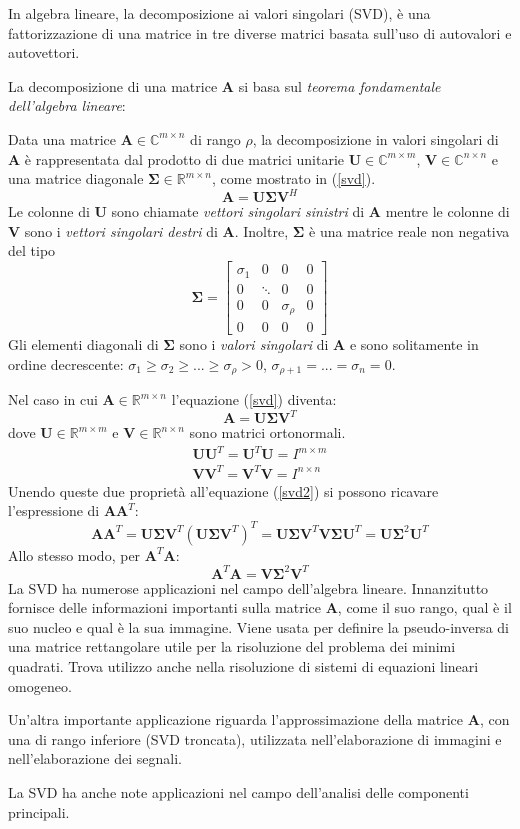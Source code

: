 In algebra lineare, la decomposizione ai valori singolari (SVD), è una fattorizzazione di una matrice in tre diverse matrici basata sull'uso di autovalori e autovettori.

La decomposizione di una matrice $\mathbf{A}$ si basa sul \textit{teorema fondamentale dell'algebra lineare}: 

Data una matrice $\mathbf{A}\in\mathbb{C}^{m\times n}$ di rango $\rho$, la decomposizione in valori singolari di $\mathbf{A}$ è rappresentata dal prodotto di due matrici unitarie $\mathbf{U}\in\mathbb{C}^{m\times m}$, $\mathbf{V}\in\mathbb{C}^{n\times n}$ e una matrice diagonale $\mathbf{\Sigma}\in\mathbb{R}^{m\times n}$, come mostrato in (\ref{svd}).
\begin{equation}\label{svd}
\mathbf{A}=\mathbf{U}\mathbf{\Sigma}\mathbf{V}^H
\end{equation}
Le colonne di $\mathbf{U}$ sono chiamate \textit{vettori singolari sinistri} di $\mathbf{A}$ mentre le colonne di $\mathbf{V}$ sono i \textit{vettori singolari destri} di $\mathbf{A}$. Inoltre, $\mathbf{\Sigma}$ è una matrice reale non negativa del tipo
\[
\mathbf{\Sigma}=\begin{bmatrix}
\sigma_1 & 0 & 0 & 0\\
0 & \ddots & 0 & 0\\
0 & 0 & \sigma_{\rho} & 0\\
0 & 0 & 0 & 0
\end{bmatrix}
\]
Gli elementi diagonali di $\mathbf{\Sigma}$ sono i \textit{valori singolari} di $\mathbf{A}$ e sono solitamente in ordine decrescente: $\sigma_1 \geq \sigma_2 \geq ... \geq \sigma_{\rho} > 0$, $\sigma_{\rho+1}=...=\sigma_n=0$.

Nel caso in cui $\mathbf{A}\in\mathbb{R}^{m\times n}$ l'equazione (\ref{svd}) diventa:
\begin{equation}\label{svd2}
\mathbf{A}=\mathbf{U}\mathbf{\Sigma}\mathbf{V}^T
\end{equation}
dove $\mathbf{U}\in\mathbb{R}^{m\times m}$ e $\mathbf{V}\in\mathbb{R}^{n\times n}$ sono matrici ortonormali.
\begin{eqnarray}
\mathbf{U}\mathbf{U}^T=\mathbf{U}^T\mathbf{U}=I^{m\times m}\\
\mathbf{V}\mathbf{V}^T=\mathbf{V}^T\mathbf{V}=I^{n\times n}
\end{eqnarray}
Unendo queste due proprietà all'equazione (\ref{svd2}) si possono ricavare l'espressione di $\mathbf{A}\mathbf{A}^T$:
\[
\mathbf{A}\mathbf{A}^T=\mathbf{U}\mathbf{\Sigma}\mathbf{V}^T(\mathbf{U}\mathbf{\Sigma}\mathbf{V}^T)^T=\mathbf{U}\mathbf{\Sigma}\mathbf{V}^T\mathbf{V}\mathbf{\Sigma}\mathbf{U}^T=\mathbf{U}\mathbf{\Sigma}^2\mathbf{U}^T
\]
Allo stesso modo, per $\mathbf{A}^T\mathbf{A}$:
\[
\mathbf{A}^T\mathbf{A}=\mathbf{V}\mathbf{\Sigma}^2\mathbf{V}^T
\]
La SVD ha numerose applicazioni nel campo dell'algebra lineare. Innanzitutto fornisce delle informazioni importanti sulla matrice $\mathbf{A}$, come il suo rango, qual è il suo nucleo e qual è la sua immagine. Viene usata per definire la pseudo-inversa di una matrice rettangolare utile per la risoluzione del problema dei minimi quadrati. Trova utilizzo anche nella risoluzione di sistemi di equazioni lineari omogeneo.

Un'altra importante applicazione riguarda l'approssimazione della matrice $\mathbf{A}$, con una di rango inferiore (SVD troncata), utilizzata nell'elaborazione di immagini e nell'elaborazione dei segnali.

La SVD ha anche note applicazioni nel campo dell'analisi delle componenti principali.



